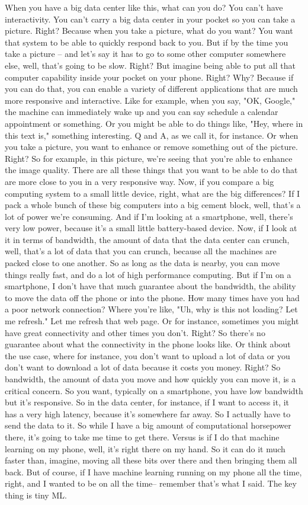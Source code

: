 When you have a big data center like this, what can you do?
You can't have interactivity.
You can't carry a big data center in your pocket so you can take a picture.
Right?
Because when you take a picture, what do you want?
You want that system to be able to quickly respond back to you.
But if by the time you take a picture -- and let's say it has to go to some other computer somewhere else, well, that's going to be slow.
Right?
But imagine being able to put all that computer capability inside your pocket on your phone.
Right?
Why?
Because if you can do that, you can enable a variety of different applications that are much more responsive and interactive.
Like for example, when you say, "OK, Google," the machine can immediately wake up and you can say schedule a calendar appointment or something.
Or you might be able to do things like, "Hey, where in this text is," something interesting.
Q and A, as we call it, for instance.
Or when you take a picture, you want to enhance or remove something out of the picture.
Right?
So for example, in this picture, we're seeing that you're able to enhance the image quality.
There are all these things that you want to be able to do that are more close to you in a very responsive way.
Now, if you compare a big computing system to a small little device, right, what are the big differences?
If I pack a whole bunch of these big computers into a big cement block, well, that's a lot of power we're consuming.
And if I'm looking at a smartphone, well, there's very low power, because it's a small little battery-based device.
Now, if I look at it in terms of bandwidth, the amount of data that the data center can crunch, well, that's a lot of data that you can crunch, because all the machines are packed close to one another.
So as long as the data is nearby, you can move things really fast, and do a lot of high performance computing.
But if I'm on a smartphone, I don't have that much guarantee about the bandwidth, the ability to move the data off the phone or into the phone.
How many times have you had a poor network connection?
Where you're like, "Uh, why is this not loading?
Let me refresh."
Let me refresh that web page.
Or for instance, sometimes you might have great connectivity and other times you don't.
Right?
So there's no guarantee about what the connectivity in the phone looks like.
Or think about the use case, where for instance, you don't want to upload a lot of data or you don't want to download a lot of data because it costs you money.
Right?
So bandwidth, the amount of data you move and how quickly you can move it, is a critical concern.
So you want, typically on a smartphone, you have low bandwidth but it's responsive.
So in the data center, for instance, if I want to access it, it has a very high latency, because it's somewhere far away.
So I actually have to send the data to it.
So while I have a big amount of computational horsepower there, it's going to take me time to get there.
Versus is if I do that machine learning on my phone, well, it's right there on my hand.
So it can do it much faster than, imagine, moving all these bits over there and then bringing them all back.
But of course, if I have machine learning running on my phone all the time, right, and I wanted to be on all the time-- remember that's what I said.
The key thing is tiny ML.

